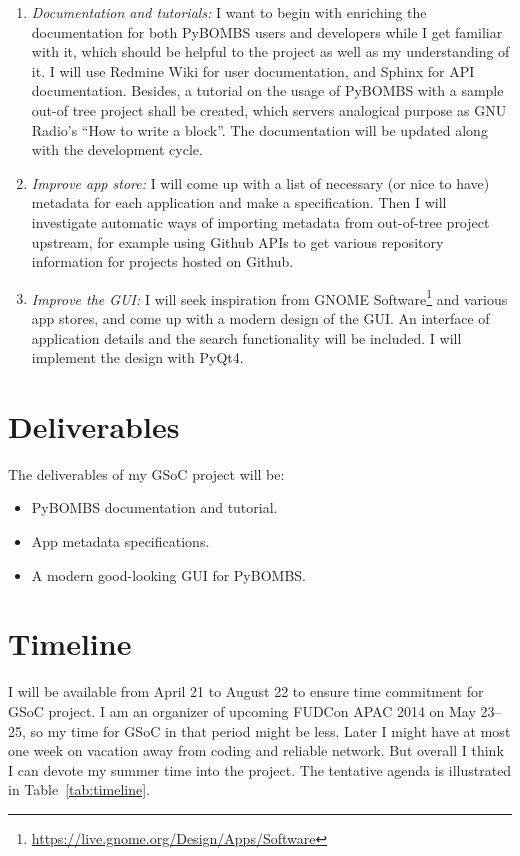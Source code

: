 \documentclass[a4paper]{article}
\begin{document}
\begin{enumerate}
  \item \emph{Documentation and tutorials:} I want to begin with
    enriching the documentation for both PyBOMBS users and developers
    while I get familiar with it, which should be helpful to the
    project as well as my understanding of it. I will use Redmine Wiki
    for user documentation, and Sphinx for API documentation.
    Besides, a tutorial on the usage of PyBOMBS with a sample out-of\-
    tree project shall be created, which servers analogical purpose as
    GNU Radio's ``How to write a block''. The documentation will be
    updated along with the development cycle.
  \item \emph{Improve app store:} I will come up with a list of
    necessary (or nice to have) metadata for each application and make a
    specification. Then I will investigate automatic ways of importing
    metadata from out-of-tree project upstream, for example using Github
    APIs to get various repository information for projects hosted on
    Github.
  \item \emph{Improve the GUI:} I will seek inspiration from GNOME
    Software\footnote{\url{https://live.gnome.org/Design/Apps/Software}}
    and various app stores, and come up with a modern design
    of the GUI. An interface of application details and the search
    functionality will be included. I will implement the design with
    PyQt4.
\end{enumerate}

\section{Deliverables}

The deliverables of my GSoC project will be:
\begin{itemize}
  \item PyBOMBS documentation and tutorial.
  \item App metadata specifications.
  \item A modern good-looking GUI for PyBOMBS.
\end{itemize}

\section{Timeline}

I will be available from April 21 to August 22 to ensure time commitment
for GSoC project.  I am an organizer of upcoming FUDCon APAC 2014 on May
23--25, so my time for GSoC in that period might be less.  Later I might
have at most one week on vacation away from coding and reliable network.
But overall I think I can devote my summer time into the project.
The tentative agenda is illustrated in Table~\ref{tab:timeline}.
\end{document}
